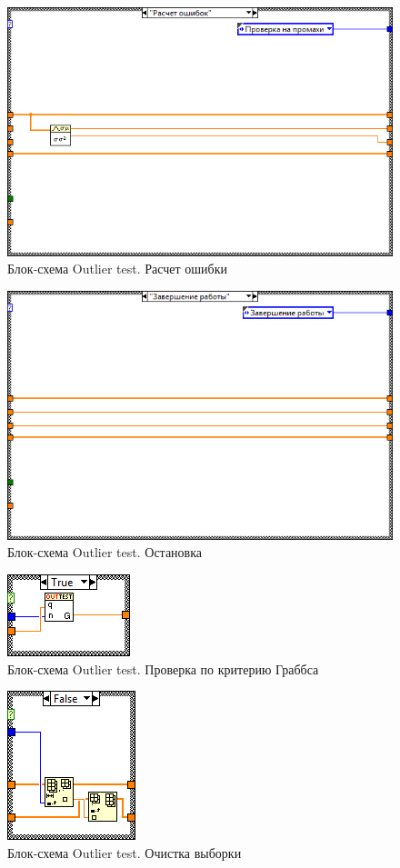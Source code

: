 \documentclass[a4paper,14pt]{article}
\begin{document}
\begin{figure}[H]
	\centering		
	\includegraphics[width=0.5\linewidth]{image/ot_schema_err}
	\caption{Блок-схема Outlier test. Расчет ошибки}\label{img:ot_schema_err}
\end{figure}
\begin{figure}[H]
	\centering		
	\includegraphics[width=0.5\linewidth]{image/ot_schema_stop}
	\caption{Блок-схема Outlier test. Остановка}\label{img:ot_schema_stop}
\end{figure}
\begin{figure}[H]
	\centering		
	\includegraphics[width=0.3\linewidth]{image/ot_schema_grubbs}
	\caption{Блок-схема Outlier test. Проверка по критерию Граббса}\label{img:ot_schema_grubbs}
\end{figure}

\begin{figure}[H]
	\centering		
	\includegraphics[width=0.3\linewidth]{image/ot_schema_remove}
	\caption{Блок-схема Outlier test. Очистка выборки}\label{img:ot_schema_remove}
\end{figure}
\end{document}

